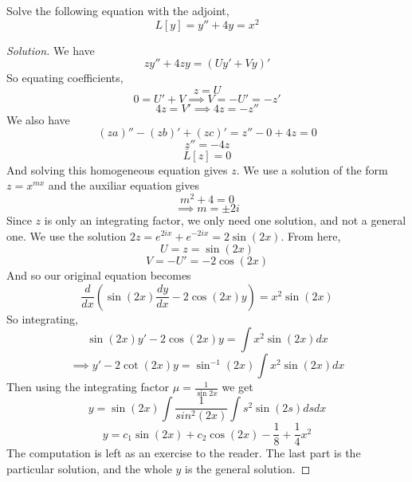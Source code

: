 \begin{example}
  Solve the following equation with the adjoint,
  \[L[y] = y''+4y=x^2\]
\end{example}
\begin{proof}[Solution]
  We have
  \[zy'' +4zy= (Uy' + Vy)'\]
  So equating coefficients,
  \[z=U\]
  \[0=U'+V \implies V=-U'=-z'\]
  \[4z = V' \implies 4z= -z''\]
  We also have
  \[(za)'' - (zb)' + (zc)' = z'' - 0 +4z =0\]
  \[z'' = -4z\]
  \[\bar{L}[z]=0\]
  And solving this homogeneous equation gives $z$. We use a solution of the form
  $z=x^{mx}$ and the auxiliar equation gives
  \[m^2 + 4 = 0\]
  \[\implies m= \pm 2 i\]
  Since $z$ is only an integrating factor, we only need one solution, and not a general
  one. We use the solution $2z=e^{2ix}+e^{-2ix} = 2\sin(2x)$.
  From here,
  \[U = z = \sin(2x)\]
  \[V = -U' = -2\cos(2x)\]
  And so our original equation becomes
  \[\frac{d}{dx} (\sin(2x) \frac{dy}{dx} - 2\cos(2x) y) = x^2 \sin(2x)\]
  So integrating, 
  \[\sin(2x)y' -2\cos(2x)y = \int x^2 \sin(2x) dx\]
  \[\implies y' -2\cot(2x)y = \sin^{-1}(2x)\int x^2 \sin(2x) dx\]
  Then using the integrating factor $\mu = \frac{1}{\sin 2x}$ we get 
  \[y = \sin(2x) \int \frac{1}{sin^2(2x)}\int s^2 \sin (2s) ds dx\]
  \[y = c_1 \sin(2x) + c_2 \cos(2x) - \frac{1}{8} + \frac{1}{4}x^2\]
  The computation is left as an exercise to the reader. The last part is the particular
  solution, and the whole $y$ is the general solution.

\end{proof}
